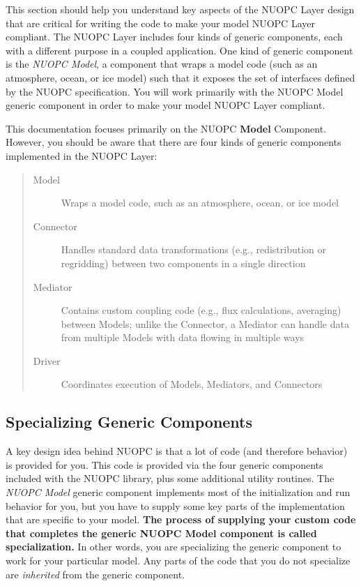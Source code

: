 
\label{sec:bigidea}
This section should help you understand key aspects of the NUOPC Layer
design that are critical for writing the code to make your model
NUOPC Layer compliant.  The NUOPC Layer includes four kinds of
generic components, each with a different purpose in a
coupled application.  One kind of generic component is the
\emph{NUOPC Model},  a component that wraps a model
code (such as an atmosphere, ocean, or ice model) such that it
exposes the set of interfaces defined by the NUOPC specification.
You will work primarily with the NUOPC Model generic component
in order to make your model NUOPC Layer compliant.

This documentation focuses primarily on the NUOPC \textbf{Model} Component.
However, you should be aware that there are four kinds of generic
components implemented in the NUOPC Layer:

\begin{quote}
\begin{description}
\item[{Model}] \leavevmode
Wraps a model code, such as an atmosphere, ocean, or ice model

\item[{Connector}] \leavevmode
Handles standard data transformations (e.g., redistribution
or regridding) between two components in a single direction

\item[{Mediator}] \leavevmode
Contains custom coupling code (e.g., flux calculations, averaging)
between Models; unlike the Connector, a Mediator can handle
data from multiple Models with data flowing in multiple ways

\item[{Driver}] \leavevmode
Coordinates execution of Models, Mediators, and Connectors

\end{description}
\end{quote}


\subsection{Specializing Generic Components}

A key design idea behind NUOPC is that a lot of code (and therefore
behavior) is provided for you.  This code is provided via the
four generic components included with the NUOPC library, plus
some additional utility routines.
The \emph{NUOPC Model} generic component
implements most of the initialization and run behavior for you, but you
have to supply some key parts of the implementation that are specific
to your model.  \textbf{The process of supplying your custom code that completes
the generic NUOPC Model component is called specialization.}  In other
words, you are specializing the generic component to work for your
particular model.  Any parts of the code that you do not specialize are
\emph{inherited} from the generic component.

